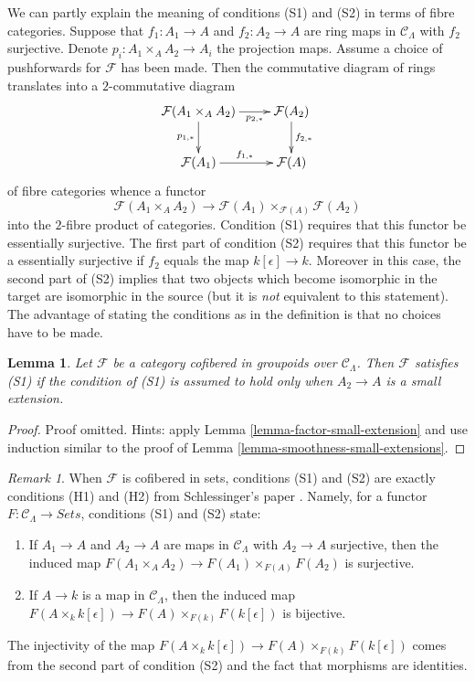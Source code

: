 \documentclass{stacks-project}
\theoremstyle{plain}
\newtheorem{lemma}[subsection]{Lemma}
\theoremstyle{definition}
\theoremstyle{remark}
\newtheorem{remark}[subsection]{Remark}
\numberwithin{equation}{subsection}
\begin{document}
\noindent
We can partly explain the meaning of conditions (S1) and (S2) in terms of
fibre categories. Suppose that $f_1 : A_1 \to A$ and $f_2 : A_2 \to A$ are
ring maps in $\mathcal{C}_\Lambda$ with $f_2$ surjective.
Denote $p_i : A_1 \times_A A_2 \to A_i$ the projection maps.
Assume a choice of pushforwards for $\mathcal{F}$ has been made.
Then the commutative diagram of rings translates into a $2$-commutative diagram
$$
\xymatrix{
\mathcal{F}(A_1 \times_A A_2) \ar[r]_-{p_{2, *}} \ar[d]_{p_{1, *}} &
\mathcal{F}(A_2) \ar[d]^{f_{2, *}} \\
\mathcal{F}(A_1) \ar[r]^{f_{1, *}} & \mathcal{F}(A)
}
$$
of fibre categories whence a functor
\begin{equation}
\label{equation-compare}
\mathcal{F}(A_1 \times_A A_2) \to
\mathcal{F}(A_1) \times_{\mathcal{F}(A)} \mathcal{F}(A_2)
\end{equation}
into the $2$-fibre product of categories.
Condition (S1) requires that this functor be essentially surjective.
The first part of condition (S2) requires that this functor be a
essentially surjective if $f_2$ equals the map $k[\epsilon] \to k$.
Moreover in this case, the second part of (S2) implies that two objects
which become isomorphic in the target are isomorphic in the source
(but it is {\it not} equivalent to this statement).
The advantage of stating the conditions as in the definition
is that no choices have to be made.

\begin{lemma}
\label{lemma-S1-small-extensions}
Let $\mathcal{F}$ be a category cofibered in groupoids over $\mathcal
C_\Lambda$. Then $\mathcal{F}$ satisfies (S1) if the condition of (S1)
is assumed to hold only when $A_2 \to A$ is a small extension.
\end{lemma}

\begin{proof}
Proof omitted. Hints: apply Lemma \ref{lemma-factor-small-extension}
and use induction similar to the proof of
Lemma \ref{lemma-smoothness-small-extensions}.
\end{proof}

\begin{remark}
\label{remark-compare-S1-S2-schlessinger}
When $\mathcal{F}$ is cofibered in sets, conditions (S1) and (S2) are exactly
conditions (H1) and (H2) from Schlessinger's paper \cite{Sch}.
Namely, for a functor $F: \mathcal{C}_\Lambda \to
\textit{Sets}$, conditions (S1) and (S2) state:
\begin{enumerate}
\item [(S1)] If $A_1 \to A$ and $A_2 \to A$ are maps in
$\mathcal{C}_\Lambda$ with $A_2 \to A$ surjective, then the induced
map $F(A_1 \times_A A_2) \to F(A_1) \times_{F(A)} F(A_2)$ is
surjective.
\item [(S2)]  If $A \to k$ is a map in $\mathcal{C}_\Lambda$, then the
induced map
$F(A \times_k k[\epsilon]) \to F(A) \times_{F(k)} F(k[\epsilon])$
is bijective.
\end{enumerate}
The injectivity of the map
$F(A \times_k k[\epsilon]) \to F(A) \times_{F(k)} F(k[\epsilon])$
comes from the second part of condition (S2) and the fact that morphisms
are identities.
\end{remark}
\end{document}
